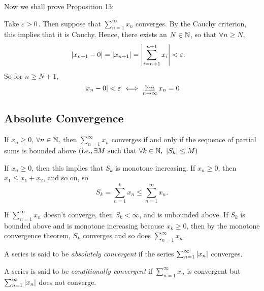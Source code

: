 \documentclass[12pt]{article}
\theoremstyle{definition}
\renewenvironment{proof}[1][\proofname]{\vspace{-10pt}\begin{replacementproof}}{\end{replacementproof}}
\newcommand{\xseries}{\sum_{n = 1}^{\infty}x_{n}}
\newcommand{\nlim}{\lim_{n\rightarrow\infty}}
\begin{document}
            Now we shall prove Proposition 13:
            \begin{proof}
                Take $\varepsilon > 0$. Then suppose that $\xseries$ converges. By the Cauchy criterion, this implies that it is Cauchy. Hence, there exists an $N \in \mathbb{N}$, so that $\forall n \geq N$, 
                \begin{align*}
                    \left|x_{n + 1} - 0\right| = \left|x_{n + 1}\right| &= \left|\sum_{i = n + 1}^{n + 1}x_{i}\right| < \varepsilon.
                \end{align*}
                So for $n \geq N + 1$, 
                \begin{equation*}
                    \abs{x_{n} - 0} < \varep ~ \Longleftrightarrow ~ \nlim x_{n} = 0
                \end{equation*}
            \end{proof}

        \newpage
        \subsection{Absolute Convergence}
            \begin{prop}
                If $x_n \geq 0$, $\forall n \in \mathbb{N}$, then $\xseries$ converges if and only if the sequence of partial sums is bounded above $\left(\text{i.e.}, \exists M ~ \text{such that} ~ \forall k \in \mathbb{N}, ~ \left|S_{k}\right| \leq M\right)$
            \end{prop}
            \begin{remark}
                If $x_n \geq 0$, then this implies that $S_{k}$ is monotone increasing. If $x_{n} \geq 0$, then $x_{1} \leq x_{1} + x_{2}$, and so on, so
                \begin{equation*}
                    S_{k} = \sum_{n = 1}^{k}x_{n} \leq \xseries.
                \end{equation*}

                If $\xseries$ doesn't converge, then $S_{k} < \infty$, and is unbounded above. If $S_{k}$ is bounded above and is monotone increasing because $x_{k} \geq 0$, then by the monotone convergence theorem, $S_{k}$ converges and so does $\xseries$. 
            \end{remark}
            \begin{definition}
                A series is said to be \emph{absolutely convergent} if the series $\sum_{n = 1}^{\infty}\left|x_{n}\right|$ converges. 
            \end{definition}
            \begin{definition}
               A series is said to be \emph{conditionally convergent} if $\xseries$ is convergent but $\sum_{n = 1}^{\infty}\left|x_{n}\right|$ does not converge.
            \end{definition}
\end{document}
